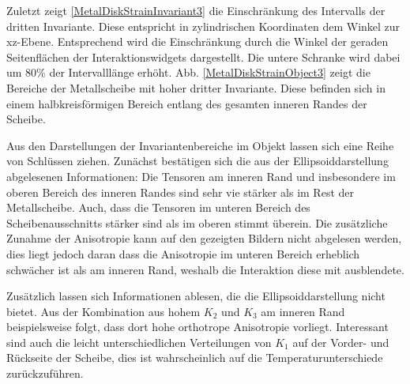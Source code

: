 \documentclass[a4paper,fontsize=12pt,toc=bib,halfparskip]{scrartcl}
\begin{document}
Zuletzt zeigt \ref{MetalDiskStrainInvariant3} die Einschr\"ankung des Intervalls der dritten Invariante. Diese entspricht in zylindrischen Koordinaten dem Winkel zur xz-Ebene. Entsprechend wird die Einschr\"ankung durch die Winkel der geraden Seitenfl\"achen der Interaktionswidgets dargestellt. Die untere Schranke wird dabei um 80\% der Intervalll\"ange erh\"oht. Abb. \ref{MetalDiskStrainObject3} zeigt die Bereiche der Metallscheibe mit hoher dritter Invariante. Diese befinden sich in einem halbkreisf\"ormigen Bereich entlang des gesamten inneren Randes der Scheibe.

Aus den Darstellungen der Invariantenbereiche im Objekt lassen sich eine Reihe von Schl\"ussen ziehen. Zun\"achst best\"atigen sich die aus der Ellipsoiddarstellung abgelesenen Informationen: Die Tensoren am inneren Rand und insbesondere im oberen Bereich des inneren Randes sind sehr vie st\"arker als im Rest der Metallscheibe. Auch, dass die Tensoren im unteren Bereich des Scheibenausschnitts st\"arker sind als im oberen stimmt \"uberein. Die zus\"atzliche Zunahme der Anisotropie kann auf den gezeigten Bildern nicht abgelesen werden, dies liegt jedoch daran dass die Anisotropie im unteren Bereich erheblich schw\"acher ist als am inneren Rand, weshalb die Interaktion diese mit ausblendete.

Zus\"atzlich lassen sich Informationen ablesen, die die Ellipsoiddarstellung nicht bietet. Aus der Kombination aus hohem $K_2$ und $K_3$ am inneren Rand beispielsweise folgt, dass dort hohe orthotrope Anisotropie vorliegt. Interessant sind auch die leicht unterschiedlichen Verteilungen von $K_1$ auf der Vorder- und R\"uckseite der Scheibe, dies ist wahrscheinlich auf die Temperaturunterschiede zur\"uckzuf\"uhren. 
\end{document}
